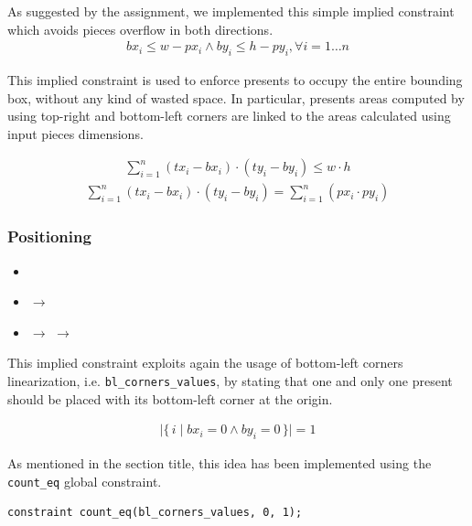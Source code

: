 \documentclass[a4paper,10pt]{article}
\newcommand{\xmark}{\ding{55}}%
\newcounter{subsubsubsection}[subsubsection]
\begin{document}
As suggested by the assignment, we implemented this simple implied constraint which avoids pieces overflow in both directions.
\begin{gather*}
   bx_{i} \leq w - px_{i} \wedge by_{i} \leq h - py_{i}, \forall{i = 1 \dots n}
\end{gather*}

 \label{sec:areas-summation}
This implied constraint is used to enforce presents to occupy the entire bounding box, without any kind of wasted space.
In particular, presents areas computed by using top-right and bottom-left corners are linked to the areas calculated using input pieces dimensions.

\begin{gather*}
   \sum_{i=1}^{n} (tx_{i} - bx_{i}) \cdot (ty_{i} - by_{i}) \leq w \cdot h
\end{gather*}
\begin{gather*}
   \sum_{i=1}^{n} (tx_{i} - bx_{i}) \cdot (ty_{i} - by_{i}) = \sum_{i=1}^{n} (px_{i} \cdot py_{i})
\end{gather*}

\subsubsection{Positioning}
\begin{itemize}
   \item {}
   \item {} $\rightarrow$ \xmark
   \item {} $\rightarrow$ $\rightarrow$ \xmark
\end{itemize}

 \label{sec:present-at-origin}
This implied constraint exploits again the usage of bottom-left corners linearization, i.e. \texttt{bl\_corners\_values},
by stating that one and only one present should be placed with its bottom-left corner at the origin.

\begin{gather*}
   \lvert\{\,i \mid bx_{i} = 0 \wedge by_{i} = 0\,\}\rvert = 1
\end{gather*}

As mentioned in the section title, this idea has been implemented using the \texttt{count\_eq} global constraint.

\begin{Verbatim}[samepage=true]
   constraint count_eq(bl_corners_values, 0, 1);
\end{Verbatim}
\end{document}
